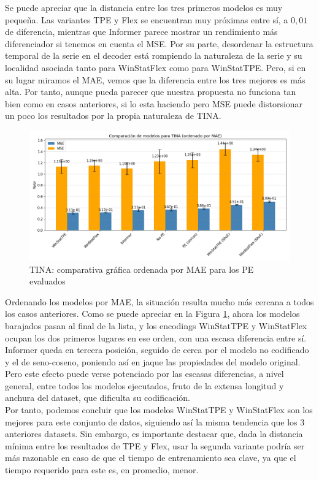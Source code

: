 Se puede apreciar que la distancia entre los tres primeros modelos es muy pequeña. Las variantes TPE y Flex se encuentran muy próximas entre sí, a $0,01$ de diferencia, mientras que Informer parece mostrar un rendimiento más diferenciador si tenemos en cuenta el MSE. Por su parte, desordenar la estructura temporal de la serie en el decoder está rompiendo la naturaleza de la serie y su localidad asociada tanto para WinStatFlex como para WinStatTPE. Pero, si en su lugar miramos el MAE, vemos que la diferencia entre los tres mejores es más alta. Por tanto, aunque pueda parecer que nuestra propuesta no funciona tan bien como en casos anteriores, si lo esta haciendo pero MSE puede distorsionar un poco los resultados por la propia naturaleza de TINA.\\

\begin{figure}[!ht]
	\centering
	\includegraphics[scale=0.45]{img/tinafinal2}
	\caption{TINA: comparativa gráfica ordenada por MAE para los PE evaluados}
	\label{tinafinal2}
\end{figure}

Ordenando los modelos por MAE, la situación resulta mucho más cercana a todos los casos anteriores. Como se puede apreciar en la Figura \ref{tinafinal2}, ahora los modelos barajados pasan al final de la lista, y los encodings WinStatTPE y WinStatFlex ocupan los dos primeros lugares en ese orden, con una escasa diferencia entre sí. Informer queda en tercera posición, seguido de cerca por el modelo no codificado y el de seno-coseno, poniendo así en jaque las propiedades del modelo original. Pero este efecto puede verse potenciado por las escasas diferencias, a nivel general, entre todos los modelos ejecutados, fruto de la extensa longitud y anchura del dataset, que dificulta su codificación.\\

Por tanto, podemos concluir que los modelos WinStatTPE y WinStatFlex son los mejores para este conjunto de datos, siguiendo así la misma tendencia que los 3 anteriores datasets. Sin embargo, es importante destacar que, dada la distancia mínima entre los resultados de TPE y Flex, usar la segunda variante podría ser más razonable en caso de que el tiempo de entrenamiento sea clave, ya que el tiempo requerido para este es, en promedio, menor.


